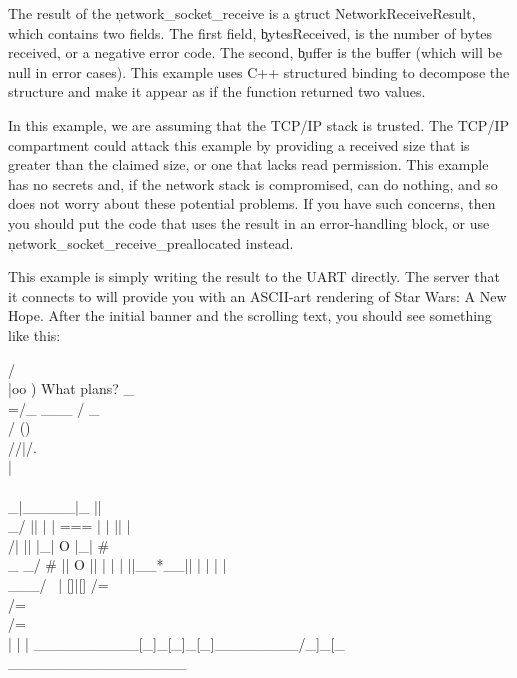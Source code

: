 {The result of the \c{network_socket_receive} is a \c{struct NetworkReceiveResult}, which contains two fields.
The first field, \c{bytesReceived}, is the number of bytes received, or a negative error code.
The second, \c{buffer} is the buffer (which will be null in error cases).
This example uses C++ structured binding to decompose the structure and make it appear as if the function returned two values.

In this example, we are assuming that the TCP/IP stack is trusted.
The TCP/IP compartment could attack this example by providing a received size that is greater than the claimed size, or one that lacks read permission.
This example has no secrets and, if the network stack is compromised, can do nothing, and so does not worry about these potential problems.
If you have such concerns, then you should put the code that uses the result in an error-handling block, or use \c{network_socket_receive_preallocated} instead.

This example is simply writing the result to the UART directly.
The server that it connects to will provide you with an ASCII-art rendering of Star Wars: A New Hope.
After the initial banner and the scrolling text, you should see something like this:

\begin{console}
                               /~\\                   
                              |oo )       What plans? 
                              _\\=/_                  
              ___            /  _  \\                 
             / ()\\          //|/.\\|\\\\                
           _|_____|_       ||  \\_/  ||               
          | | === | |      || |\\ /| ||               
          |_|  O  |_|      #  \\_ _/ #                
           ||  O  ||          | | |                   
           ||__*__||          | | |                   
          |~ \\___/ ~|         []|[]                  
          /=\\ /=\\ /=\\         | | |                  
__________[_]_[_]_[_]________/_]_[_\\_________________
\end{console}

}
